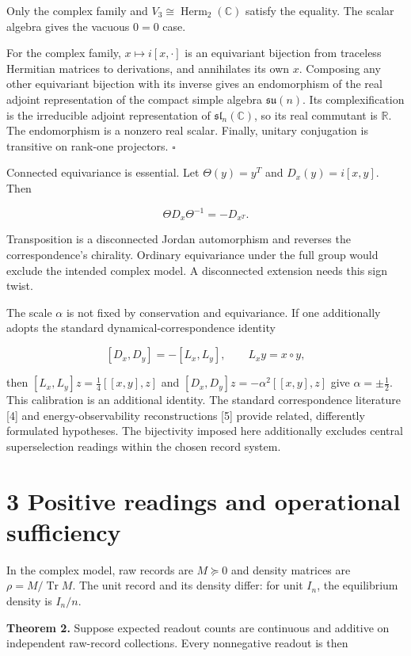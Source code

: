 \documentclass[
  11pt,
  a4paper,
]{article}
\begin{document}
Only the complex family and \(V_3\cong\operatorname{Herm}_2(\mathbb C)\) satisfy the equality. The scalar algebra gives the vacuous \(0=0\) case.

For the complex family, \(x\mapsto i[x,\cdot]\) is an equivariant bijection from traceless Hermitian matrices to derivations, and annihilates its own \(x\). Composing any other equivariant bijection with its inverse gives an endomorphism of the real adjoint representation of the compact simple algebra \(\mathfrak{su}(n)\). Its complexification is the irreducible adjoint representation of \(\mathfrak{sl}_n(\mathbb C)\), so its real commutant is \(\mathbb R\). The endomorphism is a nonzero real scalar. Finally, unitary conjugation is transitive on rank-one projectors. \(\square\)

Connected equivariance is essential. Let \(\Theta(y)=y^T\) and \(D_x(y)=i[x,y]\). Then

\[\Theta D_x\Theta^{-1}=-D_{x^T}.\]

Transposition is a disconnected Jordan automorphism and reverses the correspondence's chirality. Ordinary equivariance under the full group would exclude the intended complex model. A disconnected extension needs this sign twist.

The scale \(\alpha\) is not fixed by conservation and equivariance. If one additionally adopts the standard dynamical-correspondence identity

\[[D_x,D_y]=-[L_x,L_y],\qquad L_xy=x\circ y,\]

then \([L_x,L_y]z=\tfrac14[[x,y],z]\) and \([D_x,D_y]z=-\alpha^2[[x,y],z]\) give \(\alpha=\pm\tfrac12\). This calibration is an additional identity. The standard correspondence literature {[}4{]} and energy-observability reconstructions {[}5{]} provide related, differently formulated hypotheses. The bijectivity imposed here additionally excludes central superselection readings within the chosen record system.

\section{3 Positive readings and operational sufficiency}\label{positive-readings-and-operational-sufficiency}

In the complex model, raw records are \(M\succeq0\) and density matrices are \(\rho=M/\operatorname{Tr}M\). The unit record and its density differ: for unit \(I_n\), the equilibrium density is \(I_n/n\).

\textbf{Theorem 2.} Suppose expected readout counts are continuous and additive on independent raw-record collections. Every nonnegative readout is then
\end{document}
